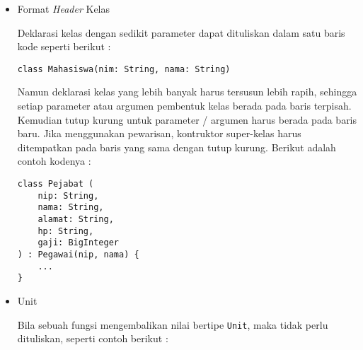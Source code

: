 \begin{itemize}
\begin{lstlisting}
[4, 5]
\end{lstlisting}

Untuk lambda sederhana tidak perlu melakukan definisi parameter, cukup menggunakan kata kunci \texttt{it}. Namun pada lambda yang memiliki parameter, harus selalu menyertakan parameter dan isinya. Seperti contoh kode berikut untuk lambda yang menyertakan parameternya :

\begin{lstlisting}
fun main(args: Array<String>) {
	val list = listOf(1, 2, 3, 4, 5)
	println(list.map { data -> data * 2 } )
}
\end{lstlisting}

Inti dari kode di atas sebetulnya ada pada baris ke-3, pada bagian \texttt{data -> data * 2}, inilah bentuk lambda di Kotlin. Seluruh isi pada variabel \texttt{list} akan dikalikan dengan 2 dengan perintah tersebut, sehingga hasil keluarannya adalah seperti berikut :

\begin{lstlisting}
[2, 4, 6, 8, 10]
\end{lstlisting}
	
	\item Format \textit{Header} Kelas
	
Deklarasi kelas dengan sedikit parameter dapat dituliskan dalam satu baris kode seperti berikut :

\begin{lstlisting}
class Mahasiswa(nim: String, nama: String)
\end{lstlisting}	

Namun deklarasi kelas yang lebih banyak harus tersusun lebih rapih, sehingga setiap parameter atau argumen pembentuk kelas berada pada baris terpisah. Kemudian tutup kurung untuk parameter / argumen harus berada pada baris baru. Jika menggunakan pewarisan, kontruktor super-kelas harus ditempatkan pada baris yang sama dengan tutup kurung. Berikut adalah contoh kodenya :

\begin{lstlisting}
class Pejabat (
    nip: String,
    nama: String,
    alamat: String,
    hp: String,
    gaji: BigInteger
) : Pegawai(nip, nama) {
    ... 
}
\end{lstlisting}
	
	\item Unit
	
Bila sebuah fungsi mengembalikan nilai bertipe \texttt{Unit}, maka tidak perlu dituliskan, seperti contoh berikut :


\end{itemize}
